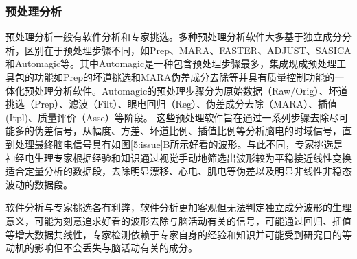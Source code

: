 \subsubsection{预处理分析}
预处理分析一般有软件分析和专家挑选。多种预处理分析软件大多基于独立成分分析，区别在于预处理步骤不同，如Prep、MARA、FASTER、ADJUST、SASICA和Automagic等。其中Automagic是一种包含预处理步骤最多，集成现成预处理工具包的功能如Prep的坏道挑选和MARA伪差成分去除等并具有质量控制功能的一体化预处理分析软件。Automagic的预处理步骤分为原始数据（Raw/Orig）、坏道挑选（Prep）、滤波（Filt）、眼电回归（Reg）、伪差成分去除（MARA）、插值(Itpl)、质量评价（Asse）等阶段。 这些预处理软件旨在通过一系列步骤去除尽可能多的伪差信号，从幅度、方差、坏道比例、插值比例等分析脑电的时域信号，直到处理最终脑电信号具有如图\ref{5:issue}B所示好看的波形。与此不同，专家挑选是神经电生理专家根据经验和知识通过视觉手动地筛选出波形较为平稳接近线性变换适合定量分析的数据段，去除明显漂移、心电、肌电等伪差以及明显非线性非稳态波动的数据段。

软件分析与专家挑选各有利弊，软件分析更加客观但无法判定独立成分波形的生理意义，可能为刻意追求好看的波形去除与脑活动有关的信号，可能通过回归、插值等增大数据共线性，专家检测依赖于专家自身的经验和知识并可能受到研究目的等动机的影响但不会丢失与脑活动有关的成分。

